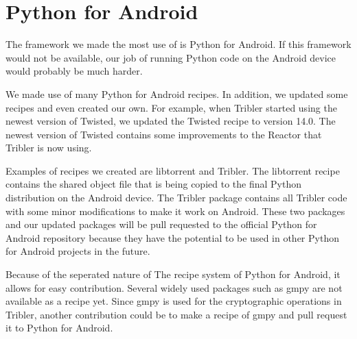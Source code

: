 \section{Python for Android}
	The framework we made the most use of is Python for Android. If this framework would not be available, our job of running Python code on the Android device would probably be much harder.
	
	We made use of many Python for Android recipes. In addition, we updated some recipes and even created our own. For example, when Tribler started using the newest version of Twisted, we updated the Twisted recipe to version 14.0. The newest version of Twisted contains some improvements to the Reactor that Tribler is now using.
	
	Examples of recipes we created are libtorrent and Tribler. The libtorrent recipe contains the shared object file that is being copied to the final Python distribution on the Android device. The Tribler package contains all Tribler code with some minor modifications to make it work on Android. These two packages and our updated packages will be pull requested to the official Python for Android repository because they have the potential to be used in other Python for Android projects in the future.
	
	Because of the seperated nature of The recipe system of Python for Android, it allows for easy contribution. Several widely used packages such as gmpy are not available as a recipe yet. Since gmpy is used for the cryptographic operations in Tribler, another contribution could be to make a recipe of gmpy and pull request it to Python for Android.